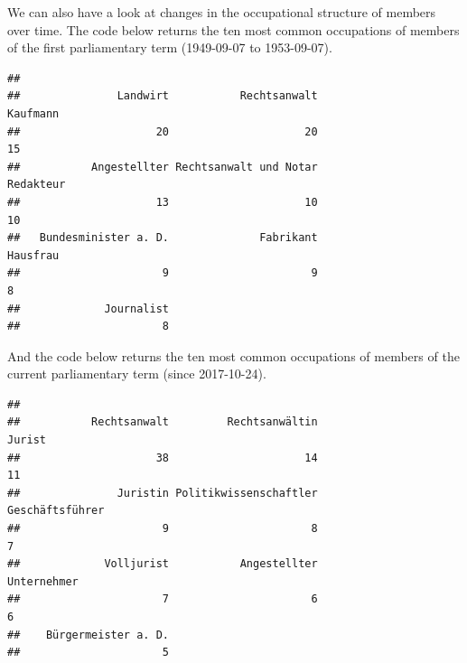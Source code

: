 \documentclass[12pt]{article}
\newenvironment{Shaded}{\begin{snugshade}}{\end{snugshade}}
\newcommand{\AttributeTok}[1]{\textcolor[rgb]{0.77,0.63,0.00}{#1}}
\newcommand{\DecValTok}[1]{\textcolor[rgb]{0.00,0.00,0.81}{#1}}
\newcommand{\FunctionTok}[1]{\textcolor[rgb]{0.00,0.00,0.00}{#1}}
\newcommand{\NormalTok}[1]{#1}
\newcommand{\SpecialCharTok}[1]{\textcolor[rgb]{0.00,0.00,0.00}{#1}}
\begin{document}
We can also have a look at changes in the occupational structure of
members over time. The code below returns the ten most common
occupations of members of the first parliamentary term (1949-09-07 to
1953-09-07).

\begin{Shaded}
\end{Shaded}

\begin{verbatim}
## 
##               Landwirt           Rechtsanwalt               Kaufmann 
##                     20                     20                     15 
##           Angestellter Rechtsanwalt und Notar              Redakteur 
##                     13                     10                     10 
##   Bundesminister a. D.              Fabrikant               Hausfrau 
##                      9                      9                      8 
##             Journalist 
##                      8
\end{verbatim}

And the code below returns the ten most common occupations of members of
the current parliamentary term (since 2017-10-24).

\begin{Shaded}
\end{Shaded}

\begin{verbatim}
## 
##           Rechtsanwalt         Rechtsanwältin                 Jurist 
##                     38                     14                     11 
##               Juristin Politikwissenschaftler        Geschäftsführer 
##                      9                      8                      7 
##             Volljurist           Angestellter            Unternehmer 
##                      7                      6                      6 
##    Bürgermeister a. D. 
##                      5
\end{verbatim}
\end{document}
